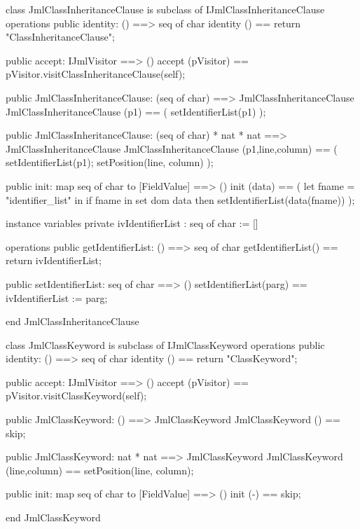 \begin{vdm_al}
class JmlClassInheritanceClause is subclass of IJmlClassInheritanceClause
operations
  public identity: () ==> seq of char
  identity () == return "ClassInheritanceClause";

  public accept: IJmlVisitor ==> ()
  accept (pVisitor) == pVisitor.visitClassInheritanceClause(self);

  public JmlClassInheritanceClause:
    (seq of char) ==> JmlClassInheritanceClause
  JmlClassInheritanceClause (p1) == 
    ( setIdentifierList(p1) );

  public JmlClassInheritanceClause:
    (seq of char) *
    nat *
    nat ==> JmlClassInheritanceClause
  JmlClassInheritanceClause (p1,line,column) == 
    ( setIdentifierList(p1);
      setPosition(line, column) );

  public init: map seq of char to [FieldValue] ==> ()
  init (data) ==
    ( let fname = "identifier_list" in
        if fname in set dom data
        then setIdentifierList(data(fname)) );

instance variables
  private ivIdentifierList : seq of char := []

operations
  public getIdentifierList: () ==> seq of char
  getIdentifierList() == return ivIdentifierList;

  public setIdentifierList: seq of char ==> ()
  setIdentifierList(parg) == ivIdentifierList := parg;

end JmlClassInheritanceClause
\end{vdm_al}

\begin{vdm_al}
class JmlClassKeyword is subclass of IJmlClassKeyword
operations
  public identity: () ==> seq of char
  identity () == return "ClassKeyword";

  public accept: IJmlVisitor ==> ()
  accept (pVisitor) == pVisitor.visitClassKeyword(self);

  public JmlClassKeyword:
    () ==> JmlClassKeyword
  JmlClassKeyword () == 
    skip;

  public JmlClassKeyword:
    nat *
    nat ==> JmlClassKeyword
  JmlClassKeyword (line,column) == 
    setPosition(line, column);

  public init: map seq of char to [FieldValue] ==> ()
  init (-) == skip;

end JmlClassKeyword
\end{vdm_al}

